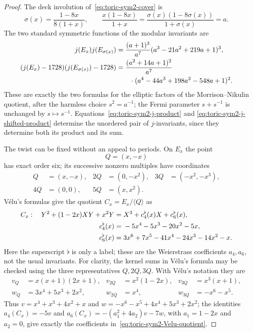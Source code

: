 \begin{proof}
The deck involution of~\eqref{eq:toric-sym2-cover} is
\begin{equation}
 \sigma(x)=\frac{1-8x}{8(1+x)},
 \qquad
 \frac{x(1-8x)}{1+x}
 =\frac{\sigma(x)(1-8\sigma(x))}{1+\sigma(x)}=a.
 \label{eq:toric-sym2-deck}
\end{equation}
The two standard symmetric functions of the modular invariants are
\begin{align}
 j(E_x)j(E_{\sigma(x)})
 &=\frac{(a+1)^3}{a^7}
   (a^3-21a^2+219a+1)^3,
 \label{eq:toric-sym2-j-product}\\
 (j(E_x)-1728)(j(E_{\sigma(x)})-1728)
 &=\frac{(a^2+14a+1)^2}{a^7}\notag\\
 &\hspace{2em}\cdot
 (a^4-44a^3+198a^2-548a+1)^2.
 \label{eq:toric-sym2-j-shifted-product}
\end{align}
These are exactly the two formulas for the elliptic factors of the
Morrison--Nikulin quotient, after the harmless choice $s^2=a^{-1}$;
the Fermi parameter $s+s^{-1}$ is unchanged by $s\mapsto s^{-1}$.
Equations~\eqref{eq:toric-sym2-j-product} and
\eqref{eq:toric-sym2-j-shifted-product} determine the unordered pair of
$j$-invariants, since they determine both its product and its sum.

The twist can be fixed without an appeal to periods.  On $E_x$ the point
\[
 Q=(x,-x)
\]
has exact order six; its successive nonzero multiples have coordinates
\begin{align*}
 Q&=(x,-x),& 2Q&=(0,-x^2),&3Q&=(-x^2,-x^3),\\
 4Q&=(0,0),&5Q&=(x,x^2).&&
\end{align*}
V\'elu's formulas give the quotient $C_x=E_x/\langle Q\rangle$ as
\begin{align}
 C_x:\quad Y^2+(1-2x)XY+x^2Y
 ={}&X^3+c_4^{\flat}(x)X+c_6^{\flat}(x),
 \label{eq:toric-sym2-Velu-quotient}\\
 c_4^{\flat}(x)={}&-5x^4-5x^3-20x^2-5x,\notag\\
 c_6^{\flat}(x)={}&3x^6+7x^5-41x^4-24x^3-14x^2-x.\notag
\end{align}
Here the superscript $\flat$ is only a label; these are the Weierstrass
coefficients $a_4,a_6$, not the usual invariants.
For clarity, the kernel sums in V\'elu's formula may be checked using the
three representatives $Q,2Q,3Q$.  With V\'elu's notation they are
\begin{align*}
 v_Q&=x(x+1)(2x+1),&
 v_{2Q}&=x^2(1-2x),&
 v_{3Q}&=x^3(x+1),\\
 w_Q&=3x^4+5x^3+2x^2,&
 w_{2Q}&=x^4,&
 w_{3Q}&=-x^6-x^5.
\end{align*}
Thus $v=x^4+x^3+4x^2+x$ and
$w=-x^6-x^5+4x^4+5x^3+2x^2$; the identities
$a_4(C_x)=-5v$ and
$a_6(C_x)=-(a_1^2+4a_2)v-7w$, with $a_1=1-2x$ and $a_2=0$, give exactly
the coefficients in~\eqref{eq:toric-sym2-Velu-quotient}.


\end{proof}
